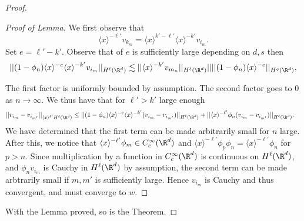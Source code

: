 \documentclass[12pt]{article}
\begin{document}
\begin{proof}
\begin{proof}[Proof of Lemma]
We first observe that 
\[\langle x \rangle^{-\ell'}v_{k_m} = \langle x \rangle^{k'-\ell'}\langle x \rangle^{-k'}v_{i_m}.\] Set $e = \ell'-k'$. Observe that of $e$ is sufficiently large depending on $d,s$ then
\begin{equation}||(1-\phi_n)\langle x \rangle^{-e}\langle x \rangle^{-k'}v_{i_m}||_{H^{\ell}(\R^d)} \lesssim ||\langle x \rangle^{-k'}v_{m_n}||_{H^{\ell}(\R^d)}||||(1-\phi_n)\langle x \rangle^{-e}||_{H^{q}(\R^d)},\end{equation}

The first factor is uniformly bounded by assumption. The second factor goes to $0$ as $n \to \infty$. We thus have that for $\ell' > k'$ large enough
\begin{align*}
||v_{i_m}-v_{i_{m'}}||_{\langle x \rangle^{\ell'}H^\ell(\R^d)} &\leq ||(1-\phi_n)\langle x \rangle^{-e}\langle x \rangle^{-k'}(v_{i_m}-v_{i_{m'}})||_{H^{\ell}(\R^d)} + ||\langle x \rangle^{-\ell'}\phi_n(v_{i_m}-v_{i_{m'}})||_{H^\ell(\R^d)}.\end{align*}
We have determined that the first term can be made arbitrarily small for $n$ large. After this, we notice that $\langle x \rangle^{-\ell'}\phi_m \in C_c^\infty(\R^d)$ and $\langle x \rangle^{-\ell'}\phi_p\phi_n = \langle x \rangle^{-\ell'}\phi_n$ for $p > n$. Since multiplication by a function in $C_c^\infty(\R^d)$ is continuous on $H^\ell(\R^d)$, and $\phi_n v_{i_m}$ is Cauchy in $H^\ell(\R^d)$ by assumption, the second term can be made arbtrarily small if $m,m'$ is sufficiently large. Hence $v_{i_m}$ is Cauchy and thus convergent, and must converge to $w$.
\end{proof}
With the Lemma proved, so is the Theorem.\end{proof}
\end{document}
